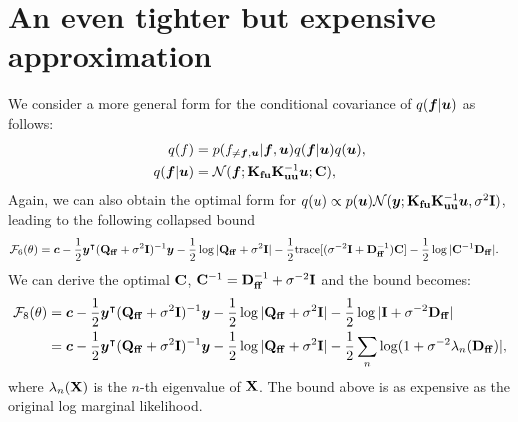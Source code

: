 \section{An even tighter but expensive approximation}
We consider a more general form for the conditional covariance of $q({\bm{f}} | {\bm{u}})$ as follows:
\begin{align}
    q(f) &= p(f_{\neq {\bm{f}}, {\bm{u}}} | {\bm{f}}, {\bm{u}}) q({\bm{f}} | {\bm{u}}) q({\bm{u}}), \nonumber\\
    q({\bm{f}} | {\bm{u}}) &= {\mathcal{N}}({\bm{f}}; \mathbf{K}_{\mathbf{fu}}\mathbf{K}_{\mathbf{uu}}^{-1}{\bm{u}}; {\mathbf{C}}),\nonumber
\end{align}
Again, we can also obtain the optimal form for $ q(u) \propto p({\bm{u}}) {\mathcal{N}}({\bm{y}}; \mathbf{K}_{\mathbf{fu}}\mathbf{K}_{\mathbf{uu}}^{-1}{\bm{u}}, \sigma^2{\mathbf{I}})$, leading to the following collapsed bound
\begin{align}
    {\mathcal{F}}_6(\theta) &= {\bm{c}} - \frac{1}{2} {\bm{y}}^\intercal (\mathbf{Q}_{\mathbf{ff}} + \sigma^2{\mathbf{I}})^{-1} {\bm{y}} - \frac{1}{2} \log |\mathbf{Q}_{\mathbf{ff}} + \sigma^2{\mathbf{I}}| - \frac{1}{2}\mathrm{trace}[(\sigma^{-2} {\mathbf{I}} + \mathbf{D}_{\mathbf{ff}}^{-1}){\mathbf{C}}] - \frac{1}{2} \log |{\mathbf{C}}^{-1}\mathbf{D}_{\mathbf{ff}}|. \nonumber
\end{align}
We can derive the optimal ${\mathbf{C}}$, ${\mathbf{C}}^{-1} = \mathbf{D}_{\mathbf{ff}}^{-1} + \sigma^{-2}{\mathbf{I}}$ and the bound becomes:
\begin{align}
    {\mathcal{F}}_8(\theta) 
    &= {\bm{c}} - \frac{1}{2} {\bm{y}}^\intercal (\mathbf{Q}_{\mathbf{ff}} + \sigma^2{\mathbf{I}})^{-1} {\bm{y}} - \frac{1}{2} \log |\mathbf{Q}_{\mathbf{ff}} + \sigma^2{\mathbf{I}}| - \frac{1}{2} \log |{\mathbf{I}} + \sigma^{-2}\mathbf{D}_{\mathbf{ff}}| \nonumber\\
    &= {\bm{c}} - \frac{1}{2} {\bm{y}}^\intercal (\mathbf{Q}_{\mathbf{ff}} + \sigma^2{\mathbf{I}})^{-1} {\bm{y}} - \frac{1}{2} \log |\mathbf{Q}_{\mathbf{ff}} + \sigma^2{\mathbf{I}}| - \frac{1}{2} \sum_n \log (1 + \sigma^{-2}\lambda_n(\mathbf{D}_{\mathbf{ff}})|,\nonumber
\end{align}
where $\lambda_n({\mathbf{X}})$ is the $n$-th eigenvalue of ${\mathbf{X}}$. The bound above is as expensive as the original log marginal likelihood. 


